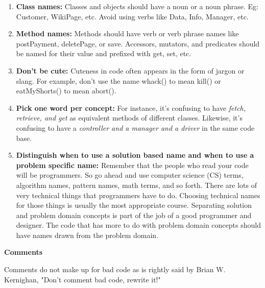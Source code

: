 \documentclass[12pt]{article}
\begin{document}
\begin{enumerate}
\begin{itemize}
    \end{itemize}
    \item \textbf{Class names:} Classes and objects should have a noun or a noun phrase. Eg: Customer, WikiPage, etc. Avoid using verbs like Data, Info, Manager, etc.
    
    \item \textbf{Method names: }Methods should have verb or verb phrase names like postPayment, deletePage, or save. Accessors, mutators, and predicates should be named for their value and prefixed with get, set, etc.    
    \item \textbf{Don't be cute: }Cuteness in code often appears in the form of jargon or slang. For example, don’t use the name whack() to mean kill() or eatMyShorts() to mean abort().
    \item \textbf{Pick one word per concept: }For instance, it’s confusing to have \textit{fetch, retrieve, and get} as equivalent methods of different classes. Likewise, it’s confusing to have a \textit{controller and a manager and a driver} in the same code base.
    
    \item \textbf{Distinguish when to use a solution based name and when to use a problem specific name: }Remember that the people who read your code will be programmers. So go ahead and use computer science (CS) terms, algorithm names, pattern names, math terms, and so forth. There are lots of very technical things that programmers have to do. Choosing technical names for those things is usually the most appropriate course. Separating solution and problem domain concepts is part of the job of a good programmer and designer. The code that has more to do with problem domain concepts should have names drawn from the problem domain.
\end{enumerate}

{\Large \textbf{Comments}\par}
Comments do not make up for bad code as is rightly said by Brian W. Kernighan, "Don't comment bad code, rewrite it!"
\end{document}
